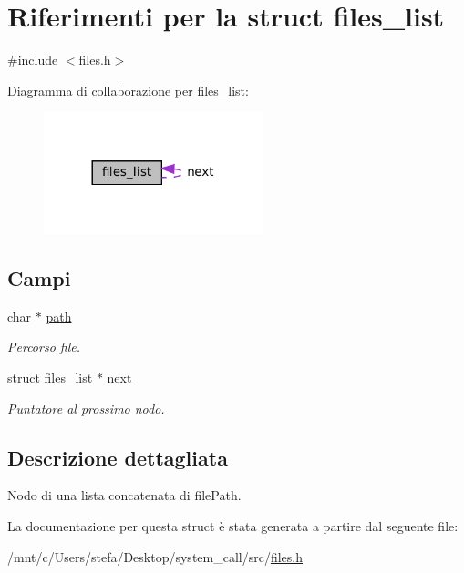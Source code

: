 \hypertarget{structfiles__list}{}\section{Riferimenti per la struct files\+\_\+list}
\label{structfiles__list}


{\ttfamily \#include $<$files.\+h$>$}



Diagramma di collaborazione per files\+\_\+list\+:\nopagebreak
\begin{figure}[H]
\begin{center}
\leavevmode
\includegraphics[width=180pt]{structfiles__list__coll__graph}
\end{center}
\end{figure}
\subsection*{Campi}
\begin{DoxyCompactItemize}
\item 
\mbox{\label{structfiles__list_a986ecc1174faf39b15c1ef655c2ed966}} 
char $\ast$ \hyperlink{structfiles__list_a986ecc1174faf39b15c1ef655c2ed966}{path}
\begin{DoxyCompactList}\small\item\em Percorso file. \end{DoxyCompactList}\item 
\mbox{\label{structfiles__list_a3cdd0098b7fb9589480f8a9facad90ce}} 
struct \hyperlink{structfiles__list}{files\+\_\+list} $\ast$ \hyperlink{structfiles__list_a3cdd0098b7fb9589480f8a9facad90ce}{next}
\begin{DoxyCompactList}\small\item\em Puntatore al prossimo nodo. \end{DoxyCompactList}\end{DoxyCompactItemize}


\subsection{Descrizione dettagliata}
Nodo di una lista concatenata di file\+Path. 

La documentazione per questa struct è stata generata a partire dal seguente file\+:\begin{DoxyCompactItemize}
\item 
/mnt/c/\+Users/stefa/\+Desktop/system\+\_\+call/src/\hyperlink{files_8h}{files.\+h}\end{DoxyCompactItemize}
